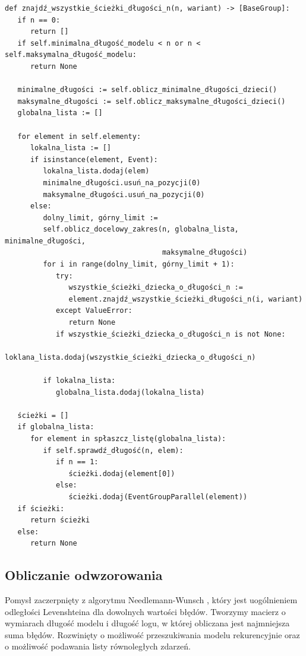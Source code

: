 \lstset{caption=Wyszukiwanie procesów o długości n, captionpos=b}
\lstset{label=src:get_n_length, frame=single}
\begin{lstlisting}[escapeinside=``]
def znajdź_wszystkie_ścieżki_długości_n(n, wariant) -> [BaseGroup]:
   if n == 0:
      return []
   if self.minimalna_długość_modelu < n or n < self.maksymalna_długość_modelu:
      return None

   minimalne_długości := self.oblicz_minimalne_długości_dzieci()
   maksymalne_długości := self.oblicz_maksymalne_długości_dzieci()
   globalna_lista := []

   for element in self.elementy:
      lokalna_lista := []
      if isinstance(element, Event):
         lokalna_lista.dodaj(elem)
         minimalne_długości.usuń_na_pozycji(0)
         maksymalne_długości.usuń_na_pozycji(0)
      else:
         dolny_limit, górny_limit := 
         self.oblicz_docelowy_zakres(n, globalna_lista, minimalne_długości, 
                                     maksymalne_długości)
         for i in range(dolny_limit, górny_limit + 1):
            try:
               wszystkie_ścieżki_dziecka_o_długości_n := 
               element.znajdź_wszystkie_ścieżki_długości_n(i, wariant)
            except ValueError:
               return None
            if wszystkie_ścieżki_dziecka_o_długości_n is not None:
               loklana_lista.dodaj(wszystkie_ścieżki_dziecka_o_długości_n)

         if lokalna_lista:
            globalna_lista.dodaj(lokalna_lista)

   ścieżki = []
   if globalna_lista:
      for element in spłaszcz_listę(globalna_lista):
         if self.sprawdź_długość(n, elem):
            if n == 1:
               ścieżki.dodaj(element[0])
            else:
               ścieżki.dodaj(EventGroupParallel(element))
   if ścieżki:
      return ścieżki
   else:
      return None
\end{lstlisting}

\subsection{Obliczanie odwzorowania}
Pomysł zaczerpnięty z algorytmu Needlemann-Wunsch \cite{ea252fd3937a4a309a5e07e61e5531a7}, który jest uogólnieniem odległości Levenshteina dla dowolnych wartości błędów. Tworzymy macierz o wymiarach długość modelu i długość logu, w której obliczana jest najmniejsza suma błędów. Rozwinięty o możliwość przeszukiwania modelu rekurencyjnie oraz o możliwość podawania listy równoległych zdarzeń.

